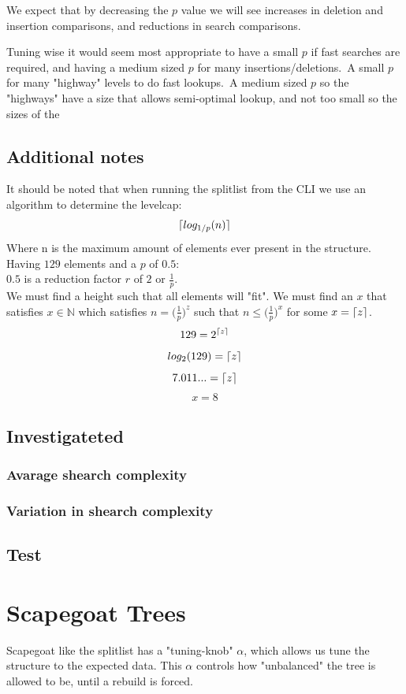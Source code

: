 \documentclass[oneside]{scrbook}
\DeclarePairedDelimiter{\ceil}{\lceil}{\rceil}
\begin{document}
We expect that by decreasing the $p$ value we will see increases in deletion and insertion comparisons, and reductions in search comparisons.

Tuning wise it would seem most appropriate to have a small $p$ if fast searches are required, and having a medium sized $p$ for many insertions/deletions.\
A small $p$ for many "highway" levels to do fast lookups.\
A medium sized $p$ so the "highways" have a size that allows semi-optimal lookup, and not too small so the sizes of the

\section*{Additional notes}
It should be noted that when running the splitlist from the CLI we use an algorithm to determine the levelcap:
$$\ceil{log_{1/p}(n)}$$
Where n is the maximum amount of elements ever present in the structure.\\
Having $129$ elements and a $p$ of $0.5$:\\
$0.5$ is a reduction factor $r$ of $2$ or $\frac{1}{p}$.\\
We must find a height such that all elements will "fit".
We must find an $x$ that satisfies $x \in \mathbb{N}$ which satisfies $n = \Big( \frac{1}{p} \Big)^{z}$ such that $n \leq \Big( \frac{1}{p} \Big)^{x}$
for some $x = \ceil{z}$.
$$129 = 2^{\ceil{z}}$$
$$log_2(129) = \ceil{z}$$
$$7.011... = \ceil{z}$$
$$x = 8$$


\section{Investigateted}
\subsection{Avarage shearch complexity}
\subsection{Variation in shearch complexity}
\section{Test}
\chapter{Scapegoat Trees}
Scapegoat like the splitlist has a "tuning-knob" $\alpha$, which allows us tune the structure to the expected data.
This $\alpha$ controls how "unbalanced" the tree is allowed to be, until a rebuild is forced.
\end{document}
